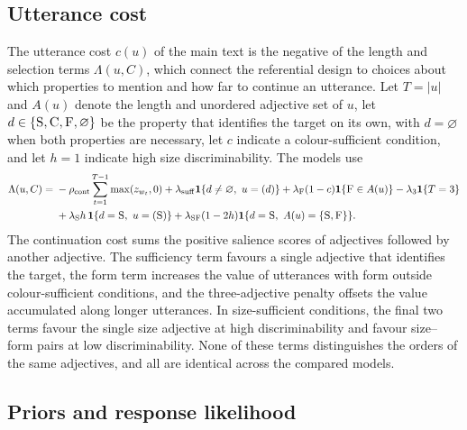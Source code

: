 \documentclass[10pt,a4paper,fleqn]{article}
\newcommand{\adj}[1]{\textsc{#1}}
\begin{document}
\subsection{Utterance cost}

The utterance cost $c(u)$ of the main text is the negative of the length and selection terms $\Lambda(u,C)$, which connect the referential design to choices about which properties to mention and how far to continue an utterance.
Let $T=|u|$ and $A(u)$ denote the length and unordered adjective set of $u$, let $d\in\{\adj{S},\adj{C},\adj{F},\varnothing\}$ be the property that identifies the target on its own, with $d=\varnothing$ when both properties are necessary, let $c$ indicate a colour-sufficient condition, and let $h=1$ indicate high size discriminability.
The models use
\begin{equation}
\begin{aligned}
\Lambda(u,C)={}&-\rho_{\mathrm{cont}}\sum_{t=1}^{T-1}\max(z_{w_t},0)
 +\lambda_{\mathrm{suff}}\mathbf{1}\{d\ne\varnothing,\ u=(d)\}
 +\lambda_{\mathrm{F}}(1-c)\mathbf{1}\{\adj{F}\in A(u)\}
 -\lambda_{3}\mathbf{1}\{T=3\}\\
&+\lambda_{\mathrm{S}}h\,\mathbf{1}\{d=\adj{S},\ u=(\adj{S})\}
 +\lambda_{\mathrm{SF}}(1-2h)\mathbf{1}\{d=\adj{S},\ A(u)=\{\adj{S},\adj{F}\}\}.
\end{aligned}
\label{eq:task-link}
\end{equation}
The continuation cost sums the positive salience scores of adjectives followed by another adjective.
The sufficiency term favours a single adjective that identifies the target, the form term increases the value of utterances with form outside colour-sufficient conditions, and the three-adjective penalty offsets the value accumulated along longer utterances.
In size-sufficient conditions, the final two terms favour the single size adjective at high discriminability and favour size--form pairs at low discriminability.
None of these terms distinguishes the orders of the same adjectives, and all are identical across the compared models.

\subsection{Priors and response likelihood}
\end{document}
